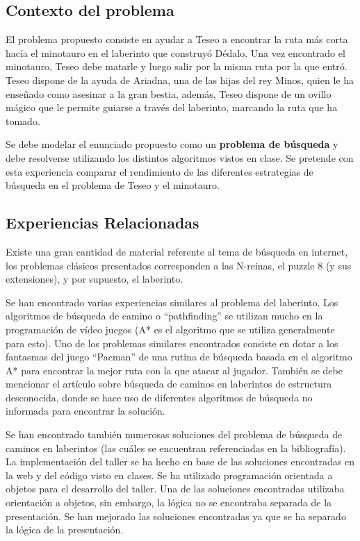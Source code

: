 \documentclass[letter, titlepage, 10pt]{article}
\begin{document}
\subsection{Contexto del problema}
El problema propuesto consiste en ayudar a Teseo a encontrar la ruta más corta hacía el minotauro en el laberinto que construyó Dédalo. Una vez encontrado el minotauro, Teseo debe matarle y luego salir por la misma ruta por la que entró. Teseo dispone de la ayuda de Ariadna, una de las hijas del rey Minos, quien le ha enseñado como asesinar a la gran bestia, además, Teseo dispone de un ovillo mágico que le permite guiarse a través del laberinto, marcando la ruta que ha tomado. 

Se debe modelar el enunciado propuesto como un \textbf{problema de búsqueda} y debe resolverse utilizando los distintos algoritmos vistos en clase. Se pretende con esta experiencia comparar el rendimiento de las diferentes estrategias de búsqueda en el problema de Teseo y el minotauro.

\subsection{Experiencias Relacionadas}
Existe una gran cantidad de material referente al tema de búsqueda en internet, los problemas clásicos presentados corresponden a las N-reinas, el puzzle 8 (y sus extensiones), y por supuesto, el laberinto.

Se han encontrado varias experiencias similares al problema del laberinto. Los algoritmos de búsqueda de camino o ``pathfinding'' se utilizan mucho en la programación de vídeo juegos (A* es el algoritmo que se utiliza generalmente para esto). Uno de los problemas similares encontrados consiste en dotar a los fantasmas del juego ``Pacman'' de una rutina de búsqueda basada en el algoritmo A* para encontrar la mejor ruta con la que atacar al jugador. También se debe mencionar el artículo sobre búsqueda de caminos en laberintos de estructura desconocida, donde se hace uso de diferentes algoritmos de búsqueda no informada para encontrar la solución.

Se han encontrado también numerosas soluciones del problema de búsqueda de caminos en laberintos (las cuáles se encuentran referenciadas en la bibliografía). La implementación del taller se ha hecho en base de las soluciones encontradas en la web y del código visto en clases. Se ha utilizado programación orientada a objetos para el desarrollo del taller. Una de las soluciones encontradas utilizaba orientación a objetos, sin embargo, la lógica no se encontraba separada de la presentación. Se han mejorado las soluciones encontradas ya que se ha separado la lógica de la presentación. 
\end{document}
